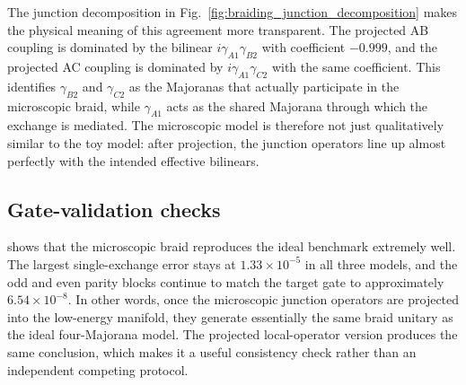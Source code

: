 The junction decomposition in Fig.~\ref{fig:braiding_junction_decomposition} makes the physical meaning of this agreement more transparent. The projected AB coupling is dominated by the bilinear $i\gamma_{A1}\gamma_{B2}$ with coefficient $-0.999$, and the projected AC coupling is dominated by $i\gamma_{A1}\gamma_{C2}$ with the same coefficient. This identifies $\gamma_{B2}$ and $\gamma_{C2}$ as the Majoranas that actually participate in the microscopic braid, while $\gamma_{A1}$ acts as the shared Majorana through which the exchange is mediated. The microscopic model is therefore not just qualitatively similar to the toy model: after projection, the junction operators line up almost perfectly with the intended effective bilinears.

\subsection{Gate-validation checks}
\begin{table}[htbp]
  \centering
  \scriptsize
  \setlength{\tabcolsep}{4pt}
  \resizebox{\textwidth}{!}{}
  \caption{Comparison of the main braid diagnostics for the ideal effective model, the projected microscopic junction model, and the alternative projected local-operator model. Here $\max(E_3-E_0)$ measures the largest instantaneous splitting inside the four-dimensional low-energy manifold, $\min(E_4-E_3)$ is the minimum gap to the excited sector, ``Max 1x err.'' is the largest deviation in the expected single-exchange Majorana map, ``Leakage'' is the off-block norm in the parity basis, and the last two columns compare the odd and even parity blocks with the target exchange gate.}
  \label{tab:braiding_checks_comparison}
\end{table}

\begin{table}[htbp]
  \centering
  \small
  
  \caption{Projected local-site operators used in the alternative braid model. The table shows that the $y$-type local operators on the first and last sites of subsystems B and C collapse onto the same low-energy Majorana channels, $\gamma_{B2}$ and $\gamma_{C2}$, up to an overall sign.}
  \label{tab:braiding_local_projection}
\end{table}

 shows that the microscopic braid reproduces the ideal benchmark extremely well. The largest single-exchange error stays at $1.33 \times 10^{-5}$ in all three models, and the odd and even parity blocks continue to match the target gate to approximately $6.54 \times 10^{-8}$. In other words, once the microscopic junction operators are projected into the low-energy manifold, they generate essentially the same braid unitary as the ideal four-Majorana model. The projected local-operator version produces the same conclusion, which makes it a useful consistency check rather than an independent competing protocol.

